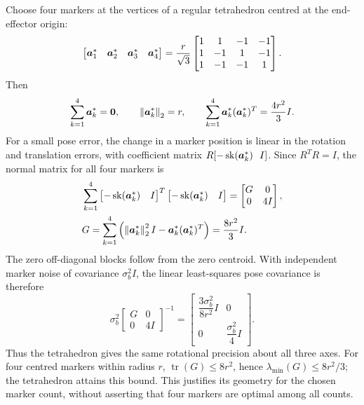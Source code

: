 \documentclass[../main.tex]{subfiles}
\begin{document}
Choose four markers at the vertices of a regular tetrahedron centred at the end-effector origin:
\begin{equation*}
\begin{bmatrix}\bm{a}_1^*&\bm{a}_2^*&\bm{a}_3^*&\bm{a}_4^*\end{bmatrix}
=\frac{r}{\sqrt3}
\begin{bmatrix}
1&1&-1&-1\\
1&-1&1&-1\\
1&-1&-1&1
\end{bmatrix}.
\end{equation*}
Then
\begin{equation*}
\sum_{k=1}^{4}\bm{a}_k^*=\bm{0},\qquad
\left\|\bm{a}_k^*\right\|_2=r,\qquad
\sum_{k=1}^{4}\bm{a}_k^*(\bm{a}_k^*)^T=\frac{4r^2}{3}I.
\end{equation*}
For a small pose error, the change in a marker position is linear in the rotation and translation errors, with coefficient matrix $R[-\operatorname{sk}(\bm{a}_k^*)\ \ I]$. Since $R^TR=I$, the normal matrix for all four markers is
\begin{equation*}
\begin{aligned}
&\sum_{k=1}^{4}
\begin{bmatrix}-\operatorname{sk}(\bm{a}_k^*)&I\end{bmatrix}^{T}
\begin{bmatrix}-\operatorname{sk}(\bm{a}_k^*)&I\end{bmatrix}
=\begin{bmatrix}G&0\\0&4I\end{bmatrix},\\
&G=\sum_{k=1}^{4}\left(\left\|\bm{a}_k^*\right\|_2^2I
-\bm{a}_k^*(\bm{a}_k^*)^T\right)
=\frac{8r^2}{3}I.
\end{aligned}
\end{equation*}
The zero off-diagonal blocks follow from the zero centroid. With independent marker noise of covariance $\sigma_b^2I$, the linear least-squares pose covariance is therefore
\begin{equation*}
\sigma_b^2
\begin{bmatrix}G&0\\0&4I\end{bmatrix}^{-1}
=\begin{bmatrix}
\dfrac{3\sigma_b^2}{8r^2}I&0\\
0&\dfrac{\sigma_b^2}{4}I
\end{bmatrix}.
\end{equation*}
Thus the tetrahedron gives the same rotational precision about all three axes. For four centred markers within radius $r$, $\operatorname{tr}(G)\leq8r^2$, hence $\lambda_{\min}(G)\leq8r^2/3$; the tetrahedron attains this bound. This justifies its geometry for the chosen marker count, without asserting that four markers are optimal among all counts.
\end{document}
